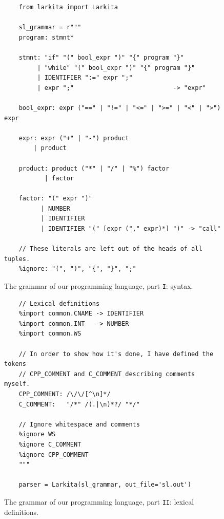 \begin{figure}[!ht]
\centering
\begin{verbatim}
    from larkita import Larkita

    sl_grammar = r"""
    program: stmnt*

    stmnt: "if" "(" bool_expr ")" "{" program "}"
         | "while" "(" bool_expr ")" "{" program "}"
         | IDENTIFIER ":=" expr ";"
         | expr ";"                           -> "expr"

    bool_expr: expr ("==" | "!=" | "<=" | ">=" | "<" | ">") expr

    expr: expr ("+" | "-") product
        | product

    product: product ("*" | "/" | "%") factor
           | factor

    factor: "(" expr ")"
          | NUMBER
          | IDENTIFIER
          | IDENTIFIER "(" [expr ("," expr)*] ")" -> "call"

    // These literals are left out of the heads of all tuples.
    %ignore: "(", ")", "{", "}", ";"
\end{verbatim}
\vspace*{-0.3cm}
\caption{The grammar of our programming language, part \texttt{I}: syntax.}
\label{fig:03-Interpreter.ipynb:grammar-1}
\end{figure}

\begin{figure}[!ht]
\centering
\begin{verbatim}
    // Lexical definitions
    %import common.CNAME -> IDENTIFIER
    %import common.INT   -> NUMBER
    %import common.WS

    // In order to show how it's done, I have defined the tokens
    // CPP_COMMENT and C_COMMENT describing comments myself.
    CPP_COMMENT: /\/\/[^\n]*/
    C_COMMENT:   "/*" /(.|\n)*?/ "*/"

    // Ignore whitespace and comments
    %ignore WS
    %ignore C_COMMENT
    %ignore CPP_COMMENT
    """

    parser = Larkita(sl_grammar, out_file='sl.out')
\end{verbatim}
\vspace*{-0.3cm}
\caption{The grammar of our programming language, part \texttt{II}: lexical definitions.}
\label{fig:03-Interpreter.ipynb:grammar-2}
\end{figure}

